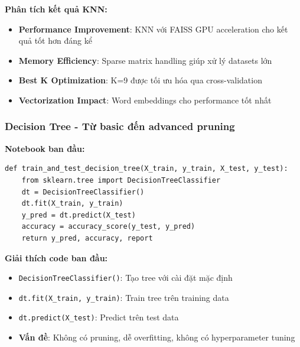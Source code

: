 \textbf{Phân tích kết quả KNN:}
\begin{itemize}
    \item \textbf{Performance Improvement}: KNN với FAISS GPU acceleration cho kết quả tốt hơn đáng kể
    \item \textbf{Memory Efficiency}: Sparse matrix handling giúp xử lý datasets lớn
    \item \textbf{Best K Optimization}: K=9 được tối ưu hóa qua cross-validation
    \item \textbf{Vectorization Impact}: Word embeddings cho performance tốt nhất
\end{itemize}

\subsubsection{Decision Tree - Từ basic đến advanced pruning}

\textbf{Notebook ban đầu:}
\begin{verbatim}
def train_and_test_decision_tree(X_train, y_train, X_test, y_test):
    from sklearn.tree import DecisionTreeClassifier
    dt = DecisionTreeClassifier()
    dt.fit(X_train, y_train)
    y_pred = dt.predict(X_test)
    accuracy = accuracy_score(y_test, y_pred)
    return y_pred, accuracy, report
\end{verbatim}

\textbf{Giải thích code ban đầu:}
\begin{itemize}
    \item \texttt{DecisionTreeClassifier()}: Tạo tree với cài đặt mặc định
    \item \texttt{dt.fit(X\_train, y\_train)}: Train tree trên training data
    \item \texttt{dt.predict(X\_test)}: Predict trên test data
    \item \textbf{Vấn đề}: Không có pruning, dễ overfitting, không có hyperparameter tuning
\end{itemize}

